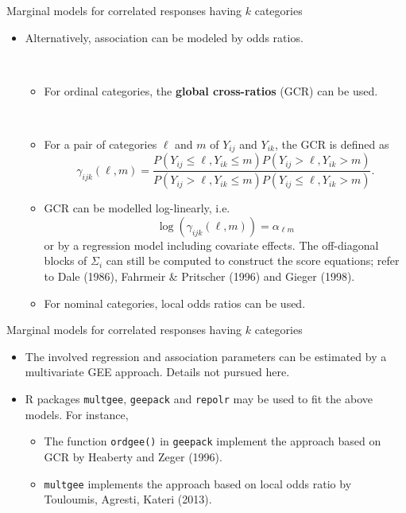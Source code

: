 \documentclass{beamer}
\newenvironment{wideitemize}%
  {\begin{itemize}%
    \setlength{\parskip}{1em}}%
  {\end{itemize}}
\begin{document}
\begin{frame}{\large Marginal models for correlated responses having $k$ categories }
\begin{itemize}

\item[(iii)] Alternatively, association can be modeled by odds ratios. 

\ \
\begin{wideitemize}
\item
For ordinal categories, the \textbf{global cross-ratios} (GCR) can be used.

\ \

\item  For a pair of categories $\ell$ and $m$ of $Y_{ij}$ and $Y_{ik}$, the GCR
is defined as 
\[
\gamma_{ijk}(\ell,m)=\frac{P(Y_{ij}\leq \ell, Y_{ik}\leq m)P(Y_{ij}>\ell, Y_{ik}>m)}{
P(Y_{ij}> \ell, Y_{ik}\leq m)P(Y_{ij}\leq \ell, Y_{ik}>m)}.
\]
\item GCR can be modelled log-linearly, i.e. 
\[
\log(\gamma_{ijk}(\ell,m))=\alpha_{\ell m}
\]
 or by 
a regression model including covariate effects.  The off-diagonal blocks of $\Sigma_i$ can still be computed to construct the score equations;  refer to Dale (1986), Fahrmeir \& Pritscher (1996) and Gieger (1998).



\item
For nominal categories, local odds ratios can be used. 
\end{wideitemize}
\end{itemize}


\end{frame}


\begin{frame}{\large Marginal models for correlated responses having $k$ categories }




\begin{wideitemize}
\item
The involved regression and association parameters can be 
estimated by a multivariate  GEE approach. Details not pursued here.
\item
R packages \texttt{multgee}, \texttt{geepack} and \texttt{repolr} may be used to fit the above models. For instance, 
\begin{wideitemize}
\item The function \texttt{ordgee()} in \texttt{geepack}  implement the approach based on GCR by Heaberty and Zeger (1996). 

\item \texttt{multgee} implements the approach based on local odds ratio by Touloumis, Agresti, Kateri (2013).
\end{wideitemize}
\end{wideitemize}

\end{frame}
\end{document}
